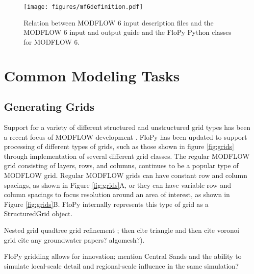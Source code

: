 \documentclass[11pt, oneside]{article}   	%
\begin{document}
\begin{figure}[h!]
	\begin{center}
		\texttt{[image: figures/mf6definition.pdf]}
	\end{center}
	\caption{Relation between MODFLOW 6 input description files and the MODFLOW 6 input and output guide and the FloPy Python classes for MODFLOW 6.}
	\label{fig:mf6definition}
\end{figure}


\section{Common Modeling Tasks}

\subsection{Generating Grids}

Support for a variety of different structured and unstructured grid types has been a recent focus of MODFLOW development \citep{modflowusg, modflow6gwf, modflow6xt3d}.  FloPy has been updated to support processing of different types of grids, such as those shown in figure \ref{fig:grids} through implementation of several different grid classes.  The regular MODFLOW grid consisting of layers, rows, and columns, continues to be a popular type of MODFLOW grid.  Regular MODFLOW grids can have constant row and column spacings, as shown in Figure \ref{fig:grids}A, or they can have variable row and column spacings to focus resolution around an area of interest, as shown in Figure \ref{fig:grids}B.  FloPy internally represents this type of grid as a StructuredGrid object.  

Nested grid \citep{modflowlgr2}
quadtree grid refinement \citep{gridgen}; 
then cite triangle \citep{trianglemesh} and 
then cite voronoi grid \citep{2020SciPy-NMeth} cite any groundwater papers? algomesh?).

FloPy gridding allows for innovation; mention Central Sands and the ability to simulate local-scale detail and regional-scale influence in the same simulation?
\end{document}
